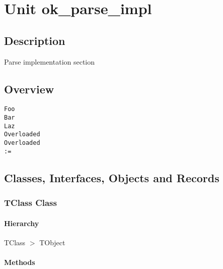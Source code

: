 \documentclass{report}
\begin{document}
\newlength{\tmplength}
\chapter{Unit ok{\_}parse{\_}impl}
\section{Description}
Parse implementation section
\section{Overview}
\begin{description}
\item[\texttt{\begin{ttfamily}TClass\end{ttfamily} Class}]
\item[\texttt{\begin{ttfamily}TMyType\end{ttfamily} Record}]
\end{description}
\begin{description}
\item[\texttt{Foo}]
\item[\texttt{Bar}]
\item[\texttt{Laz}]
\item[\texttt{Overloaded}]
\item[\texttt{Overloaded}]
\item[\texttt{:=}]
\end{description}
\section{Classes, Interfaces, Objects and Records}
\subsection*{TClass Class}
\subsubsection*{\large{\textbf{Hierarchy}}\normalsize\hspace{1ex}\hfill}
TClass {$>$} TObject
\subsubsection*{\large{\textbf{Methods}}\normalsize\hspace{1ex}\hfill}
\end{document}
